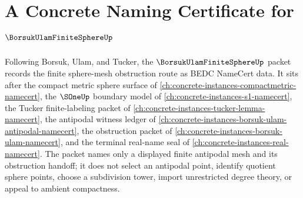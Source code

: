 \chapter{A Concrete Naming Certificate for $\BorsukUlamFiniteSphereUp$}
\label{ch:concrete-instances-borsuk-ulam-finite-sphere-namecert}

Following Borsuk, Ulam, and Tucker, the $\BorsukUlamFiniteSphereUp$ packet records the finite sphere-mesh obstruction route as BEDC NameCert data. It sits after the compact metric sphere surface of \autoref{ch:concrete-instances-compactmetric-namecert}, the $\SOneUp$ boundary model of \autoref{ch:concrete-instances-s1-namecert}, the Tucker finite-labeling packet of \autoref{ch:concrete-instances-tucker-lemma-namecert}, the antipodal witness ledger of \autoref{ch:concrete-instances-borsuk-ulam-antipodal-namecert}, the obstruction packet of \autoref{ch:concrete-instances-borsuk-ulam-namecert}, and the terminal real-name seal of \autoref{ch:concrete-instances-real-namecert}. The packet names only a displayed finite antipodal mesh and its obstruction handoff; it does not select an antipodal point, identify quotient sphere points, choose a subdivision tower, import unrestricted degree theory, or appeal to ambient compactness.

